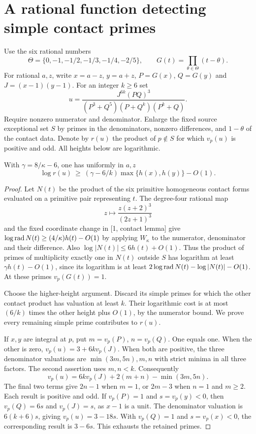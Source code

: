 \documentclass[11pt]{article}
\begin{document}
\section{A rational function detecting simple contact primes}
Use the six rational numbers
\[
 \Theta=\{0,-1,-1/2,-1/3,-1/4,-2/5\},\qquad G(t)=\prod_{\theta\in\Theta}(t-\theta).
\]
For rational $a,z$, write $x=a-z$, $y=a+z$, $P=G(x)$, $Q=G(y)$ and $J=(x-1)(y-1)$. For an integer $k\ge6$ set
\[
 u=\frac{J^{6k}(PQ)^3}{(P^3+Q^5)(P+Q^k)(P^k+Q)}.
\]
Require nonzero numerator and denominator. Enlarge the fixed source exceptional set $S$ by primes in the denominators, nonzero differences, and $1-\theta$ of the contact data. Denote by $r(u)$ the product of $p\notin S$ for which $v_p(u)$ is positive and odd. All heights below are logarithmic.
\begin{lemma}\label{radbound}
With $\gamma=8/\kappa-6$, one has uniformly in $a,z$
\[
 \log r(u)\ \ge\ (\gamma-6/k)\max\{h(x),h(y)\}-O(1).
\]
\end{lemma}
\begin{proof}
Let $N(t)$ be the product of the six primitive homogeneous contact forms evaluated on a primitive pair representing $t$. The degree-four rational map
\[
 z\longmapsto\frac{z(z+2)^3}{(2z+1)^3}
\]
and the fixed coordinate change in [1, contact lemma] give $\log\operatorname{rad} N(t)\ge(4/\kappa)h(t)-O(1)$ by applying $W_\kappa$ to the numerator, denominator and their difference. Also $\log|N(t)|\le6h(t)+O(1)$. Thus the product of primes of multiplicity exactly one in $N(t)$ outside $S$ has logarithm at least $\gamma h(t)-O(1)$, since its logarithm is at least $2\log\operatorname{rad} N(t)-\log|N(t)|-O(1)$. At these primes $v_p(G(t))=1$.

Choose the higher-height argument. Discard its simple primes for which the other contact product has valuation at least $k$. Their logarithmic cost is at most $(6/k)$ times the other height plus $O(1)$, by the numerator bound. We prove every remaining simple prime contributes to $r(u)$.

If $x,y$ are integral at $p$, put $m=v_p(P)$, $n=v_p(Q)$. One equals one. When the other is zero, $v_p(u)=3+6kv_p(J)$. When both are positive, the three denominator valuations are $\min(3m,5n),m,n$ with strict minima in all three factors. The second assertion uses $m,n<k$. Consequently
\[
 v_p(u)=6kv_p(J)+2(m+n)-\min(3m,5n).
\]
The final two terms give $2n-1$ when $m=1$, or $2m-3$ when $n=1$ and $m\ge2$. Each result is positive and odd. If $v_p(P)=1$ and $s=v_p(y)<0$, then $v_p(Q)=6s$ and $v_p(J)=s$, as $x-1$ is a unit. The denominator valuation is $6(k+6)s$, giving $v_p(u)=3-18s$. With $v_p(Q)=1$ and $s=v_p(x)<0$, the corresponding result is $3-6s$. This exhausts the retained primes.
\end{proof}
\end{document}

